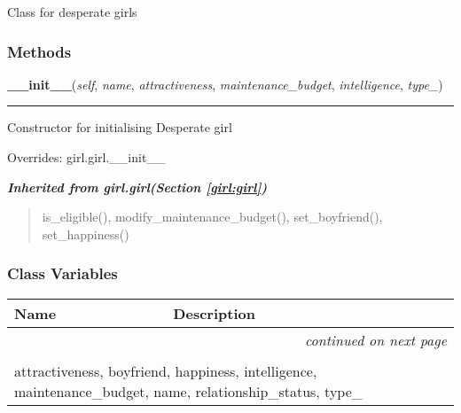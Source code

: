 Class for desperate girls



  \subsubsection{Methods}

    \vspace{0.5ex}

\hspace{.8\funcindent}\begin{boxedminipage}{\funcwidth}

    \raggedright \textbf{\_\_init\_\_}(\textit{self}, \textit{name}, \textit{attractiveness}, \textit{maintenance\_budget}, \textit{intelligence}, \textit{type\_})

    \vspace{-1.5ex}

    \rule{\textwidth}{0.5\fboxrule}
\setlength{\parskip}{2ex}
    Constructor for initialising Desperate girl

\setlength{\parskip}{1ex}
      Overrides: girl.girl.\_\_init\_\_

    \end{boxedminipage}


\large{\textbf{\textit{Inherited from girl.girl\textit{(Section \ref{girl:girl})}}}}

\begin{quote}
is\_eligible(), modify\_maintenance\_budget(), set\_boyfriend(), set\_happiness()
\end{quote}


  \subsubsection{Class Variables}

    \vspace{-1cm}
\hspace{\varindent}\begin{longtable}{|p{\varnamewidth}|p{\vardescrwidth}|l}
\cline{1-2}
\cline{1-2} \centering \textbf{Name} & \centering \textbf{Description}& \\
\cline{1-2}
\endhead\cline{1-2}\multicolumn{3}{r}{\small\textit{continued on next page}}\\\endfoot\cline{1-2}
\endlastfoot\multicolumn{2}{|l|}{\textit{Inherited from girl.girl \textit{(Section \ref{girl:girl})}}}\\
\multicolumn{2}{|p{\varwidth}|}{\raggedright attractiveness, boyfriend, happiness, intelligence, maintenance\_budget, name, relationship\_status, type\_}\\
\cline{1-2}
\end{longtable}

